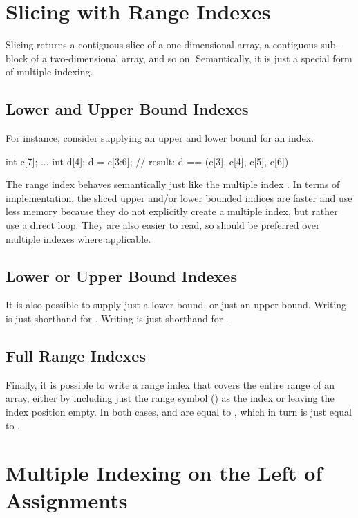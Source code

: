 \section{Slicing with Range Indexes}

Slicing returns a contiguous slice of a one-dimensional array, a
contiguous sub-block of a two-dimensional array, and so on.
Semantically, it is just a special form of multiple indexing.

\subsection{Lower and Upper Bound Indexes}

For instance, consider supplying an upper and lower bound for an
index.
%
\begin{stancode}
int c[7];
...
int d[4];
d = c[3:6];  // result: d == (c[3], c[4], c[5], c[6])
\end{stancode}
%
The range index  behaves semantically just like the multiple
index .  In terms of implementation, the sliced
upper and/or lower bounded indices are faster and use less memory 
because they do not explicitly create a multiple index, but rather use
a direct loop.  They are also easier to read, so should be preferred
over multiple indexes where applicable.

\subsection{Lower or Upper Bound Indexes}

It is also possible to supply just a lower bound, or just an upper
bound.  Writing  is just shorthand for
.  Writing  is just shorthand for 
.  

\subsection{Full Range Indexes}

Finally, it is possible to write a range index that covers the entire
range of an array, either by including just the range symbol
(\code{:}) as the index or leaving the index position empty. In both
cases,  and  are equal to ,
which in turn is just equal to .

\section{Multiple Indexing on the Left of Assignments}

